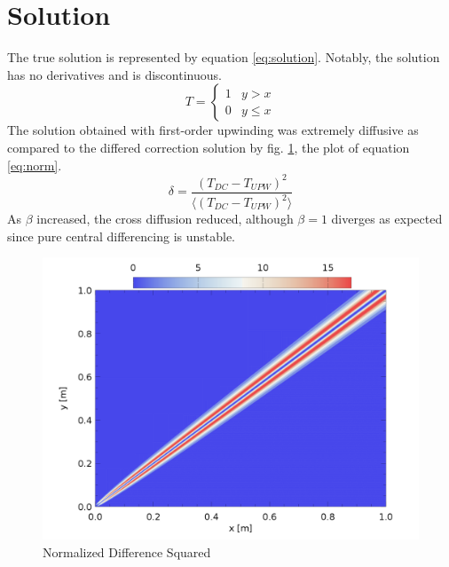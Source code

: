 \documentclass[12pt,twocolumn]{article}
\begin{document}
\section*{Solution}
The true solution is represented by equation \eqref{eq:solution}.
Notably, the solution has no derivatives and is discontinuous.
\begin{equation}\label{eq:solution}T =
\begin{cases}
1 & y > x \\
0 & y \leq x
\end{cases}
 \end{equation}
The solution obtained with first-order upwinding was extremely diffusive as compared to the differed correction solution by fig. \ref{fig:diff}, the plot of equation \eqref{eq:norm}.
\begin{equation}\label{eq:norm}\delta = \frac{(T_{DC} - T_{UPW})^2}{\langle(T_{DC} - T_{UPW})^2\rangle}\end{equation}
As $\beta$ increased, the cross diffusion reduced, although $\beta = 1$ diverges as expected since pure central differencing is unstable.

\begin{figure}
\includegraphics[width=\columnwidth]{plot/DcUpwDiff.png}
\footnotesize{\caption{Normalized Difference Squared}\label{fig:diff}}
\end{figure}
\end{document}
